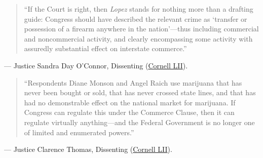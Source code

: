 \documentclass[12pt]{article}
\begin{document}
\begin{quote}
``If the Court is right, then \textit{Lopez} stands for nothing more than a drafting guide: Congress should have described the relevant crime as `transfer or possession of a firearm anywhere in the nation'---thus including commercial and noncommercial activity, and clearly encompassing some activity with assuredly substantial effect on interstate commerce.''
\end{quote}
\noindent --- Justice Sandra Day O'Connor, Dissenting (\href{https://www.law.cornell.edu/supct/html/03-1454.ZD.html}{Cornell LII}).

\begin{quote}
``Respondents Diane Monson and Angel Raich use marijuana that has never been bought or sold, that has never crossed state lines, and that has had no demonstrable effect on the national market for marijuana. If Congress can regulate this under the Commerce Clause, then it can regulate virtually anything---and the Federal Government is no longer one of limited and enumerated powers.''
\end{quote}
\noindent --- Justice Clarence Thomas, Dissenting (\href{https://www.law.cornell.edu/supct/html/03-1454.ZD1.html}{Cornell LII}).
\end{document}

